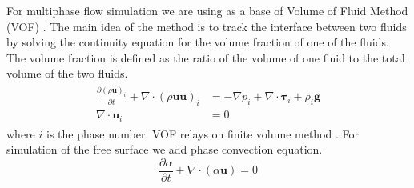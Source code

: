 For multiphase flow simulation we are using as a base of Volume of Fluid Method (VOF) \cite{hirt1981vof}. The main idea of the method is to track the interface between two fluids by solving the continuity equation for the volume fraction of one of the fluids. The volume fraction is defined as the ratio of the volume of one fluid to the total volume of the two fluids.
\begin{equation}
\begin{array}{c}
\begin{aligned}
\frac{\partial(\rho \mathbf{u})_{i}}{\partial t}+\nabla \cdot(\rho \mathbf{u u})_{i} & = -\nabla p_{i}+\nabla \cdot \boldsymbol{\tau}_{i}+\rho_{i} \mathbf{g} \\
\nabla \cdot \mathbf{u}_{i} &= 0
\end{aligned}
\end{array}
\end{equation}
where $i$ is the phase number. VOF relays on finite volume method \cite{ferziger2002cfd}. For simulation of the free surface we add phase convection equation. 
\begin{equation}
\frac{\partial \alpha}{\partial t}+\nabla \cdot(\alpha \boldsymbol{u})=0
\end{equation}

